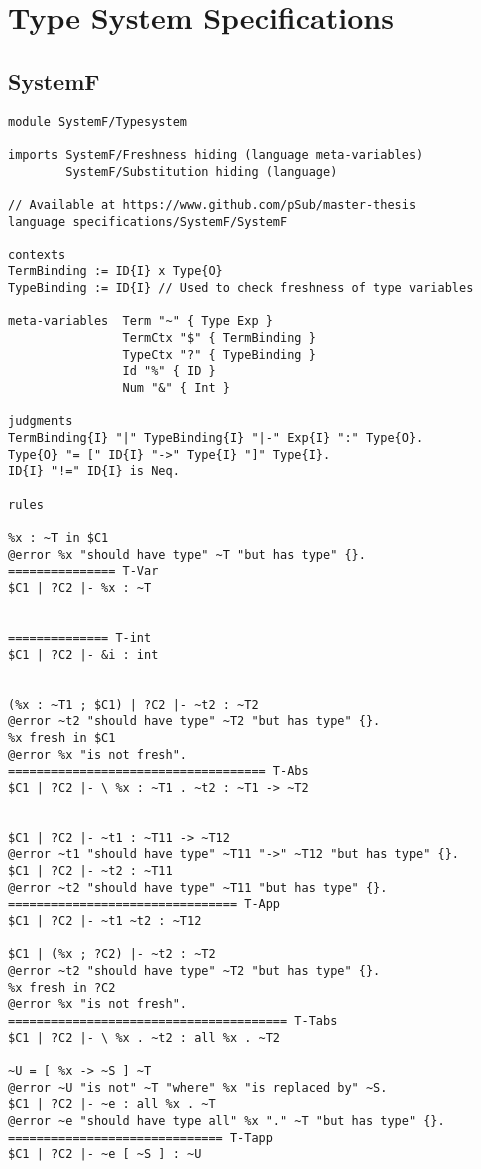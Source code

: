 \chapter{Type System Specifications}
\section{SystemF}
\label{appendix:systemf}
\begin{lstlisting}[language=sltc]
module SystemF/Typesystem

imports SystemF/Freshness hiding (language meta-variables)
        SystemF/Substitution hiding (language)

// Available at https://www.github.com/pSub/master-thesis
language specifications/SystemF/SystemF

contexts
TermBinding := ID{I} x Type{O}
TypeBinding := ID{I} // Used to check freshness of type variables

meta-variables  Term "~" { Type Exp }
                TermCtx "$" { TermBinding }
                TypeCtx "?" { TypeBinding }
                Id "%" { ID }
                Num "&" { Int }

judgments
TermBinding{I} "|" TypeBinding{I} "|-" Exp{I} ":" Type{O}.
Type{O} "= [" ID{I} "->" Type{I} "]" Type{I}.
ID{I} "!=" ID{I} is Neq.

rules

%x : ~T in $C1
@error %x "should have type" ~T "but has type" {}.
=============== T-Var
$C1 | ?C2 |- %x : ~T


============== T-int
$C1 | ?C2 |- &i : int


(%x : ~T1 ; $C1) | ?C2 |- ~t2 : ~T2
@error ~t2 "should have type" ~T2 "but has type" {}.
%x fresh in $C1
@error %x "is not fresh".
==================================== T-Abs
$C1 | ?C2 |- \ %x : ~T1 . ~t2 : ~T1 -> ~T2


$C1 | ?C2 |- ~t1 : ~T11 -> ~T12
@error ~t1 "should have type" ~T11 "->" ~T12 "but has type" {}.
$C1 | ?C2 |- ~t2 : ~T11
@error ~t2 "should have type" ~T11 "but has type" {}.
================================ T-App
$C1 | ?C2 |- ~t1 ~t2 : ~T12

$C1 | (%x ; ?C2) |- ~t2 : ~T2
@error ~t2 "should have type" ~T2 "but has type" {}.
%x fresh in ?C2
@error %x "is not fresh".
======================================= T-Tabs
$C1 | ?C2 |- \ %x . ~t2 : all %x . ~T2

~U = [ %x -> ~S ] ~T
@error ~U "is not" ~T "where" %x "is replaced by" ~S.
$C1 | ?C2 |- ~e : all %x . ~T
@error ~e "should have type all" %x "." ~T "but has type" {}.
============================== T-Tapp
$C1 | ?C2 |- ~e [ ~S ] : ~U
\end{lstlisting}
